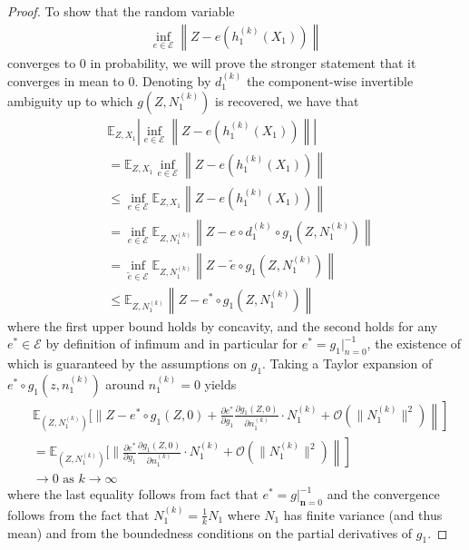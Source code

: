 \begin{proof}
To show that the random variable 
\begin{align*}
\inf_{{e}\in \mathcal{E}}  \left \|Z - {e}(h_1^{(k)}(X_1)) \right \|
\end{align*}
converges to $0$ in probability, we will prove the stronger statement that it converges in mean to $0$.
Denoting by ${d}^{(k)}_1$ the component-wise invertible ambiguity up to which ${g}(Z, N_1^{(k)})$ is recovered, we have that
	\begin{align}
	&\mathbb{E}_{Z, X_1} \left| \inf_{{e}\in \mathcal{E}}  \left \|Z - {e}(h_1^{(k)}(X_1)) \right \| \right| \\
	& = \mathbb{E}_{Z, X_1} \inf_{{e}\in \mathcal{E}}  \left \|Z - {e}(h_1^{(k)}(X_1)) \right \| \\
	& \leq \inf_{{e}\in \mathcal{E}} \mathbb{E}_{Z, X_1} \left \|Z - {e}(h_1^{(k)}(X_1)) \right \| \\
	& = \inf_{{e}\in \mathcal{E}} \mathbb{E}_{Z, N_1^{(k)}} \left \|Z - {e} \circ d_1^{(k)} \circ g_1(Z, N_1^{(k)}) \right \| \\
	& = \inf_{\tilde{e}\in \mathcal{E}} \mathbb{E}_{Z, N_1^{(k)}} \left \|Z - \tilde{e} \circ g_1(Z, N_1^{(k)}) \right \| \\
	& \leq \mathbb{E}_{Z, N_1^{(k)}} \left \|Z - e^* \circ g_1(Z, N_1^{(k)}) \right \| \label{eq:low_bounded} 
	\end{align}
	where the first upper bound holds by concavity, and the second holds for any ${e^*}\in\mathcal{E}$ by definition of infimum and in particular for ${e^*} = {g}_1 |^{-1}_{{n}=0}$, the existence of which is guaranteed by the assumptions on ${g}_1$.
	Taking a Taylor expansion of ${e^*} \circ  {g}_1(z, {n}_1^{(k)})$ around ${n}_1^{(k)}=0$ yields
	\begin{align*}
	&\mathbb{E}_{(Z, N_1^{(k)})} \Bigg[  \Bigg\|Z - e^* \circ {g}_1 (Z, 0) 
	+ \left.\left.\frac{\partial e^*}{\partial {g}_1} \frac{\partial {g}_1 (Z, 0)}{\partial {n}_1^{(k)}} \cdot N_1^{(k)} + \mathcal{O}(\|N_1^{(k)}\|^2) \right \| \right]\\
	&=\mathbb{E}_{(Z, N_1^{(k)})} \Bigg[  \Bigg\|\left.\left.\frac{\partial e^*}{\partial {g}_1} \frac{\partial {g}_1 (Z, 0)}{\partial {n}_1^{(k)}} \cdot N_1^{(k)} + \mathcal{O}(\|N_1^{(k)}\|^2) \right \| \right]\\
	&\longrightarrow 0 \text{ as $k \longrightarrow \infty$}
	\end{align*}
	where the last equality follows from fact that $e^* = g |^{-1}_{\bm{n}=0}$ and the convergence follows from the fact that $N_1^{(k)} = \frac{1}{k} N_1$ where $N_1$ has finite variance (and thus mean) and from the boundedness conditions on the partial derivatives of $g_1$.
\end{proof}
